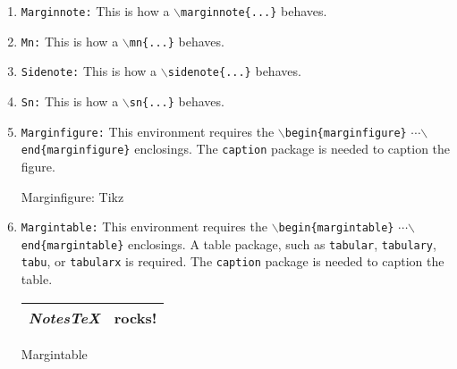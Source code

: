 \documentclass[10pt]{article}
\begin{document}
	\begin{enumerate}
		\item \texttt{Marginnote:} This is how a \texttt{$\backslash$marginnote\{...\}} behaves.
		\item \texttt{Mn:} This is how a \texttt{$\backslash$mn\{...\}} behaves.
		\item \texttt{Sidenote:} This is how a \texttt{$\backslash$sidenote\{...\}} behaves.
		\item \texttt{Sn:} This is how a \texttt{$\backslash$sn\{...\}} behaves.
		\item \texttt{Marginfigure:} This environment requires the \texttt{$\backslash$begin\{marginfigure\}} {$\cdots$}\newline\texttt{$\backslash$end\{marginfigure\}} enclosings. The \texttt{caption} package is needed to caption the figure.
		\begin{marginfigure}
		\begin{center}
		\end{center}
		\caption{Marginfigure: Tikz}
		\end{marginfigure}%
		\item \texttt{Margintable:} This environment requires the \texttt{$\backslash$begin\{margintable\}} {$\cdots$}\newline\texttt{$\backslash$end\{margintable\}} enclosings. A table package, such as \texttt{tabular}, \texttt{tabulary}, \texttt{tabu}, or \texttt{tabularx} is required. The \texttt{caption} package is needed to caption the table.
		\begin{margintable}
			\vspace{.1in}
			\begin{tabularx}{\marginparwidth}{|X|X|}
			\hline
			\textit{NotesTeX} & \textbf{rocks!}\\
			\hline
			\end{tabularx}
			\caption{Margintable}
		\end{margintable}
	\end{enumerate}
\end{document}
